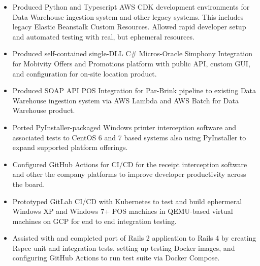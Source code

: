 \documentclass[10pt,letter,ragged2e]{altacv}
\begin{document}
\begin{paracol}{2}


\begin{itemize}
\item Produced Python and Typescript AWS CDK development environments for Data Warehouse ingestion system and other legacy systems. This includes legacy Elastic Beanstalk Custom Resources. Allowed rapid developer setup and automated testing with real, but ephemeral resources.
\item Produced self-contained single-DLL C\# Micros-Oracle Simphony Integration for Mobivity Offers and Promotions platform with public API, custom GUI, and configuration for on-site location product.
\item Produced SOAP API POS Integration for Par-Brink pipeline to existing Data Warehouse ingestion system via AWS Lambda and AWS Batch for Data Warehouse product.
\item Ported PyInstaller-packaged Windows printer interception software and associated tests to CentOS 6 and 7 based systems also using PyInstaller to expand supported platform offerings.
\item Configured GitHub Actions for CI/CD for the receipt interception software and other the company platforms to improve developer productivity across the board.
\item Prototyped GitLab CI/CD with Kubernetes to test and build ephermeral Windows XP and Windows 7+ POS machines in QEMU-based virtual machines on GCP for end to end integration testing. 
\item Assisted with and completed port of Rails 2 application to Rails 4 by creating Rspec unit and integration tests, setting up testing Docker images, and configuring GitHub Actions to run test suite via Docker Compose.

\end{itemize}
\end{paracol}
\end{document}
